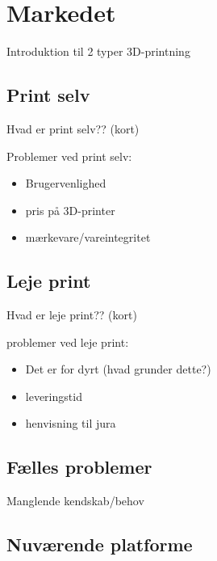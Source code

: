 \section{Markedet} %

Introduktion til 2 typer 3D-printning

\subsection{Print selv} %
\label{sub:print_selv}

Hvad er print selv?? (kort)

Problemer ved print selv:

\begin{itemize}
	\item Brugervenlighed
	\item pris på 3D-printer
	\item mærkevare/vareintegritet
\end{itemize}



\subsection{Leje print} %
\label{sub:leje_print}

Hvad er leje print?? (kort)

problemer ved leje print:

\begin{itemize}
	\item Det er for dyrt (hvad grunder dette?)
	\item leveringstid
	\item henvisning til jura
\end{itemize}


\subsection{Fælles problemer} %
\label{sub:f_lles_problemer}

Manglende kendskab/behov





\subsection{Nuværende platforme} %


